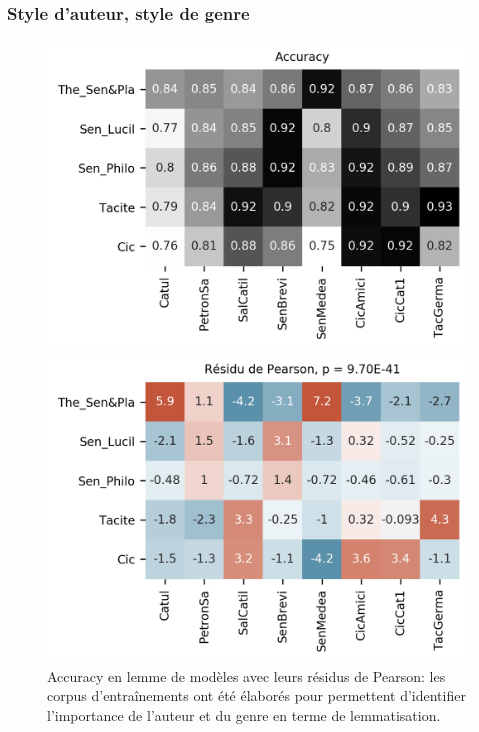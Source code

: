 \subsubsection{Style d'auteur, style de genre}

\begin{figure}[ht]
    \hspace*{-0.05\linewidth}
    \begin{minipage}[c]{0.55\linewidth}
        \includegraphics[width=1\linewidth]{results/lemmatisation/longreeVariante/LongreeVariante-AccuracyStyleDAuteurStyleDeGenre-Lemme.png}
    \end{minipage} \hfill
    \begin{minipage}[c]{0.55\linewidth}
        \includegraphics[width=1\linewidth]{results/lemmatisation/longreeVariante/LongreeVariante-AssocPlotStyleDAuteurStyleDeGenre-Lemme.png}
    \end{minipage}
    \caption{Accuracy en lemme de modèles avec leurs résidus de Pearson: les corpus d'entraînements ont été élaborés pour permettent d'identifier l'importance de l'auteur et du genre en terme de lemmatisation.}
    \label{fig:lemmatisation:longree:auteurVSforme}
\end{figure}

